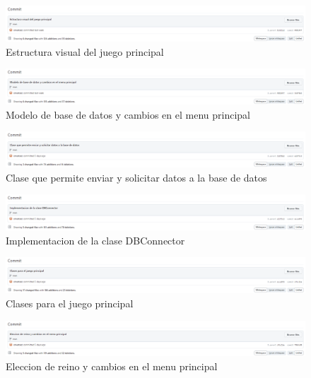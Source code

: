 \documentclass{article}
\begin{document}
\begin{figure}[H]
	\centering
	\includegraphics[width=1\textwidth,keepaspectratio]{img/commit_12.png}
	\caption{Estructura visual del juego principal}
\end{figure}
\begin{figure}[H]
	\centering
	\includegraphics[width=1\textwidth,keepaspectratio]{img/commit_13.png}
	\caption{Modelo de base de datos y cambios en el menu principal}
\end{figure}
\begin{figure}[H]
	\centering
	\includegraphics[width=1\textwidth,keepaspectratio]{img/commit_14.png}
	\caption{Clase que permite enviar y solicitar datos a la base de datos}
\end{figure}
\begin{figure}[H]
	\centering
	\includegraphics[width=1\textwidth,keepaspectratio]{img/commit_15.png}
	\caption{Implementacion de la clase DBConnector}
\end{figure}
\begin{figure}[H]
	\centering
	\includegraphics[width=1\textwidth,keepaspectratio]{img/commit_16.png}
	\caption{Clases para el juego principal}
\end{figure}
\begin{figure}[H]
	\centering
	\includegraphics[width=1\textwidth,keepaspectratio]{img/commit_17.png}
	\caption{Eleccion de reino y cambios en el menu principal}
\end{figure}
\end{document}
